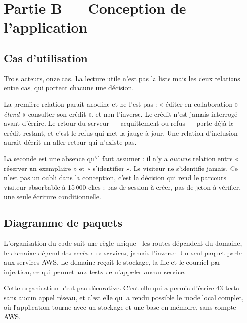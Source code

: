 \section{Partie B — Conception de l'application}

\subsection{Cas d'utilisation}

Trois acteurs, onze cas. La lecture utile n'est pas la liste mais les deux
relations entre cas, qui portent chacune une décision.


La première relation paraît anodine et ne l'est pas : « éditer en collaboration »
\emph{étend} « consulter son crédit », et non l'inverse. Le crédit n'est jamais
interrogé avant d'écrire. Le retour du serveur — acquittement ou refus — porte
déjà le crédit restant, et c'est le refus qui met la jauge à jour. Une relation
d'inclusion aurait décrit un aller-retour qui n'existe pas.

La seconde est une absence qu'il faut assumer : il n'y a \emph{aucune} relation
entre « réserver un exemplaire » et « s'identifier ». Le visiteur ne s'identifie
jamais. Ce n'est pas un oubli dans la conception, c'est la décision qui rend le
parcours visiteur absorbable à 15\,000 clics : pas de session à créer, pas de
jeton à vérifier, une seule écriture conditionnelle.

\subsection{Diagramme de paquets}

L'organisation du code suit une règle unique : les routes dépendent du domaine,
le domaine dépend des accès aux services, jamais l'inverse. Un seul paquet parle
aux services AWS. Le domaine reçoit le stockage, la file et le courriel par
injection, ce qui permet aux tests de n'appeler aucun service.


Cette organisation n'est pas décorative. C'est elle qui a permis d'écrire
43 tests sans aucun appel réseau, et c'est elle qui a rendu possible le mode
local complet, où l'application tourne avec un stockage et une base en mémoire,
sans compte AWS.

